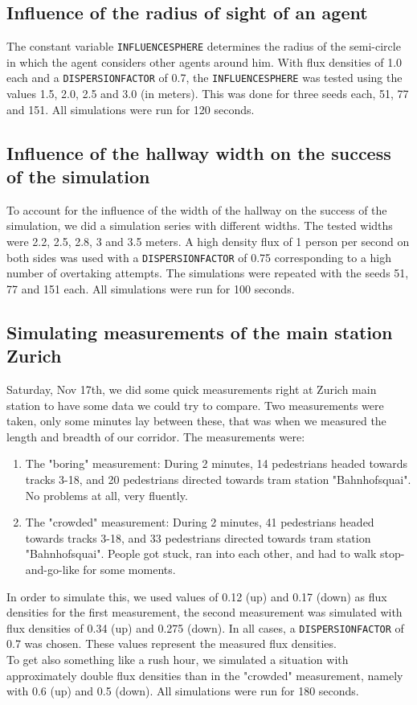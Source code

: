 \subsection{Influence of the radius of sight of an agent}
The constant variable \texttt{INFLUENCESPHERE} determines the radius of the semi-circle in which the agent considers other agents around him. With flux densities of 1.0 each and a \texttt{DISPERSIONFACTOR} of 0.7, the \texttt{INFLUENCESPHERE} was tested using the values 1.5, 2.0, 2.5 and 3.0 (in meters). This was done for three seeds each, 51, 77 and 151. All simulations were run for 120 seconds.

\subsection{Influence of the hallway width on the success of the simulation}
To account for the influence of the width of the hallway on the success of the simulation, we did a simulation series with different widths. The tested widths were 2.2, 2.5, 2.8, 3 and 3.5 meters. A high density flux of 1 person per second on both sides was used with a \texttt{DISPERSIONFACTOR} of 0.75 corresponding to a high number of overtaking attempts. The simulations were repeated with the seeds 51, 77 and 151 each. All simulations were run for 100 seconds.

\subsection{Simulating measurements of the main station Zurich}
Saturday, Nov 17th, we did some quick measurements right at Zurich main station to have some data we could try to compare. Two measurements were taken, only some minutes lay between these, that was when we measured the length and breadth of our corridor. The measurements were:
\begin{enumerate}
\item The "boring" measurement: During 2 minutes, 14 pedestrians headed towards tracks 3-18, and 20 pedestrians directed towards tram station "Bahnhofsquai". No problems at all, very fluently.
\item The "crowded" measurement: During 2 minutes, 41 pedestrians headed towards tracks 3-18, and 33 pedestrians directed towards tram station "Bahnhofsquai". People got stuck, ran into each other, and had to walk stop-and-go-like for some moments.
\end{enumerate}
\noi In order to simulate this, we used values of 0.12 (up) and 0.17 (down) as flux densities for the first measurement, the second measurement was simulated with flux densities of 0.34 (up) and 0.275 (down). In all cases, a \texttt{DISPERSIONFACTOR} of 0.7 was chosen. These values represent the measured flux densities.\\
To get also something like a rush hour, we simulated a situation with approximately double flux densities than in the "crowded" measurement, namely with 0.6 (up) and 0.5 (down). All simulations were run for 180 seconds.

